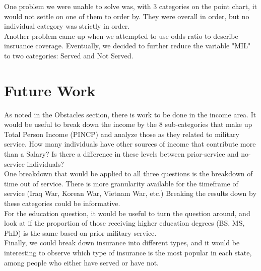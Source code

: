 \documentclass{article}
\begin{document}
One problem we were unable to solve was, with 3 categories on the point chart, it would not settle on one of them to order by. They were overall in order, but no individual category was strictly in order.\\

Another problem came up when we attempted to use odds ratio to describe insruance coverage. Eventually, we decided to further reduce the variable "MIL" to two categories: Served and Not Served.


\section{Future Work}
As noted in the Obstacles section, there is work to be done in the income area. It would be useful to break down the income by the 8 sub-categories that make up Total Person Income (PINCP) and analyze those as they related to military service. How many individuals have other sources of income that contribute more than a Salary? Is there a difference in these levels between prior-service and no-service individuals?\\

One breakdown that would be applied to all three questions is the breakdown of time out of service. There is more granularity available for the timeframe of service (Iraq War, Korean War, Vietnam War, etc.) Breaking the results down by these categories could be informative.\\ 

For the education question, it would be useful to turn the question around, and look at if the proportion of those receiving higher education degrees (BS, MS, PhD) is the same based on prior military service.\\

Finally, we could break down insurance into different types, and it would be interesting to observe which type of insurance is the most popular in each state, among people who either have served or have not.
\end{document}
